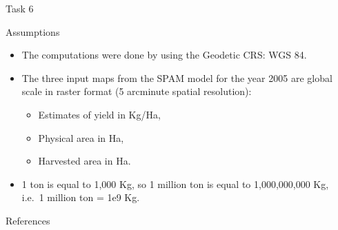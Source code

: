 \documentclass[
  ignorenonframetext,
  aspectratio=169,
]{beamer}
\providecommand{\tightlist}{%
  \setlength{\itemsep}{0pt}\setlength{\parskip}{0pt}}\usepackage{longtable,booktabs,array}
\begin{document}
\begin{frame}{Task 6}
\protect\hypertarget{task-6-1}{}
\begin{block}{Assumptions}
\protect\hypertarget{assumptions}{}
\begin{itemize}[<+->]
\item
  The computations were done by using the Geodetic CRS: WGS 84.
\item
  The three input maps from the SPAM model for the year 2005 are global
  scale in raster format (5 arcminute spatial resolution):

  \begin{itemize}[<+->]
  \tightlist
  \item
    Estimates of yield in Kg/Ha,
  \item
    Physical area in Ha,
  \item
    Harvested area in Ha.
  \end{itemize}
\item
  1 ton is equal to 1,000 Kg, so 1 million ton is equal to 1,000,000,000
  Kg, i.e.~1 million ton = 1e9 Kg.
\end{itemize}
\end{block}
\end{frame}

\begin{frame}{References}
\protect\hypertarget{references}{}
\renewcommand{\bibsection}{}

\end{frame}
\end{document}
